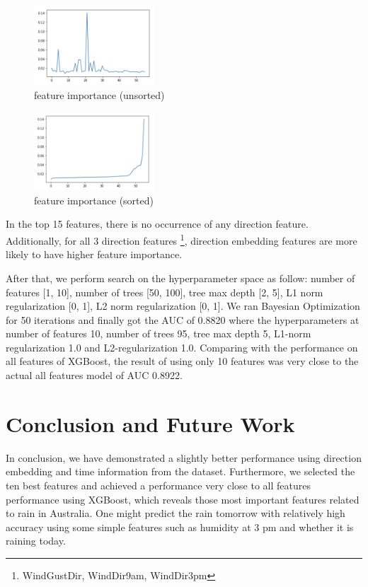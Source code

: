 \documentclass{article}
\begin{document}
\begin{figure}[h!]
\centering
\includegraphics[width=0.4\textwidth]{importance.png}
\caption{feature importance (unsorted)}
\label{fig:importance}
\end{figure}

\begin{figure}[h!]
\centering
\includegraphics[width=0.4\textwidth]{importance_sorted.png}
\caption{feature importance (sorted)}
\label{fig:importance_sorted}
\end{figure}


In the top 15 features, there is no occurrence of any direction feature. Additionally, for all 3 direction features \footnote{WindGustDir, WindDir9am, WindDir3pm}, direction embedding features are more likely to have higher feature importance.

After that, we perform search on the hyperparameter space as follow: number of features [1, 10], number of trees [50, 100], tree max depth [2, 5], L1 norm regularization [0, 1], L2 norm regularization [0, 1]. We ran Bayesian Optimization for 50 iterations and finally got the AUC of 0.8820 where the hyperparameters at number of features 10, number of trees 95, tree max depth 5, L1-norm regularization 1.0 and L2-regularization 1.0. Comparing with the performance on all features of XGBoost, the result of using only 10 features was very close to the actual all features model of AUC 0.8922.

\section{Conclusion and Future Work}

In conclusion, we have demonstrated a slightly better performance using direction embedding and time information from the dataset. Furthermore, we selected the ten best features and achieved a performance very close to all features performance using XGBoost, which reveals those most important features related to rain in Australia. One might predict the rain tomorrow with relatively high accuracy using some simple features such as humidity at 3 pm and whether it is raining today.
\end{document}
